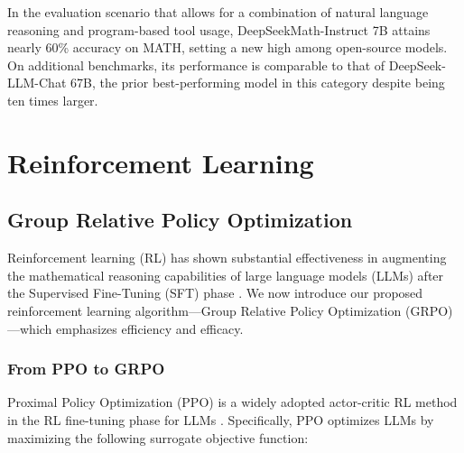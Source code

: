 In the evaluation scenario that allows for a combination of natural language reasoning and program-based tool usage, DeepSeekMath-Instruct 7B attains nearly 60\% accuracy on MATH, setting a new high among open-source models. On additional benchmarks, its performance is comparable to that of DeepSeek-LLM-Chat 67B, the prior best-performing model in this category despite being ten times larger.
\section{Reinforcement Learning}

\subsection{Group Relative Policy Optimization} Reinforcement learning (RL) has shown substantial effectiveness in augmenting the mathematical reasoning capabilities of large language models (LLMs) after the Supervised Fine-Tuning (SFT) phase \citep{wang2023math,wizardmath}. We now introduce our proposed reinforcement learning algorithm—Group Relative Policy Optimization (GRPO)—which emphasizes efficiency and efficacy.

\subsubsection{From PPO to GRPO} Proximal Policy Optimization (PPO) \citep{schulman2017proximal} is a widely adopted actor-critic RL method in the RL fine-tuning phase for LLMs \citep{ouyang2022training}. Specifically, PPO optimizes LLMs by maximizing the following surrogate objective function:

